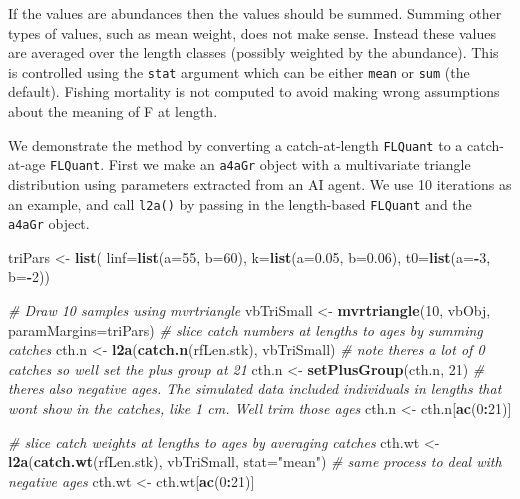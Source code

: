 \documentclass[
]{book}
\newenvironment{Shaded}{\begin{snugshade}}{\end{snugshade}}
\newcommand{\AttributeTok}[1]{\textcolor[rgb]{0.13,0.29,0.53}{#1}}
\newcommand{\CommentTok}[1]{\textcolor[rgb]{0.56,0.35,0.01}{\textit{#1}}}
\newcommand{\DecValTok}[1]{\textcolor[rgb]{0.00,0.00,0.81}{#1}}
\newcommand{\FloatTok}[1]{\textcolor[rgb]{0.00,0.00,0.81}{#1}}
\newcommand{\FunctionTok}[1]{\textcolor[rgb]{0.13,0.29,0.53}{\textbf{#1}}}
\newcommand{\NormalTok}[1]{#1}
\newcommand{\OtherTok}[1]{\textcolor[rgb]{0.56,0.35,0.01}{#1}}
\newcommand{\SpecialCharTok}[1]{\textcolor[rgb]{0.81,0.36,0.00}{\textbf{#1}}}
\newcommand{\StringTok}[1]{\textcolor[rgb]{0.31,0.60,0.02}{#1}}
\begin{document}
If the values are abundances then the values should be summed. Summing other types of values, such as mean weight, does not make sense. Instead these values are averaged over the length classes (possibly weighted by the abundance). This is controlled using the \texttt{stat} argument which can be either \texttt{mean} or \texttt{sum} (the default). Fishing mortality is not computed to avoid making wrong assumptions about the meaning of F at length.

We demonstrate the method by converting a catch-at-length \texttt{FLQuant} to a catch-at-age \texttt{FLQuant}. First we make an \texttt{a4aGr} object with a multivariate triangle distribution using parameters extracted from an AI agent. We use 10 iterations as an example, and call \texttt{l2a()} by passing in the length-based \texttt{FLQuant} and the \texttt{a4aGr} object.

\begin{Shaded}
\begin{Highlighting}[]
\NormalTok{triPars }\OtherTok{\textless{}{-}} \FunctionTok{list}\NormalTok{(}
  \AttributeTok{linf=}\FunctionTok{list}\NormalTok{(}\AttributeTok{a=}\DecValTok{55}\NormalTok{, }\AttributeTok{b=}\DecValTok{60}\NormalTok{),}
  \AttributeTok{k=}\FunctionTok{list}\NormalTok{(}\AttributeTok{a=}\FloatTok{0.05}\NormalTok{, }\AttributeTok{b=}\FloatTok{0.06}\NormalTok{),}
  \AttributeTok{t0=}\FunctionTok{list}\NormalTok{(}\AttributeTok{a=}\SpecialCharTok{{-}}\DecValTok{3}\NormalTok{, }\AttributeTok{b=}\SpecialCharTok{{-}}\DecValTok{2}\NormalTok{))}

\CommentTok{\# Draw 10 samples using mvrtriangle}
\NormalTok{vbTriSmall }\OtherTok{\textless{}{-}} \FunctionTok{mvrtriangle}\NormalTok{(}\DecValTok{10}\NormalTok{, vbObj, }\AttributeTok{paramMargins=}\NormalTok{triPars)}
\CommentTok{\# slice catch numbers at lengths to ages by summing catches}
\NormalTok{cth.n }\OtherTok{\textless{}{-}} \FunctionTok{l2a}\NormalTok{(}\FunctionTok{catch.n}\NormalTok{(rfLen.stk), vbTriSmall)}
\CommentTok{\# note there\textquotesingle{}s a lot of 0 catches so we\textquotesingle{}ll set the plus group at 21}
\NormalTok{cth.n }\OtherTok{\textless{}{-}} \FunctionTok{setPlusGroup}\NormalTok{(cth.n, }\DecValTok{21}\NormalTok{)}
\CommentTok{\# there\textquotesingle{}s also negative ages. The simulated data included individuals in lengths that won\textquotesingle{}t show in the catches, like 1 cm. We\textquotesingle{}ll trim those ages}
\NormalTok{cth.n }\OtherTok{\textless{}{-}}\NormalTok{ cth.n[}\FunctionTok{ac}\NormalTok{(}\DecValTok{0}\SpecialCharTok{:}\DecValTok{21}\NormalTok{)]}

\CommentTok{\# slice catch weights at lengths to ages by averaging catches}
\NormalTok{cth.wt }\OtherTok{\textless{}{-}} \FunctionTok{l2a}\NormalTok{(}\FunctionTok{catch.wt}\NormalTok{(rfLen.stk), vbTriSmall, }\AttributeTok{stat=}\StringTok{"mean"}\NormalTok{)}
\CommentTok{\# same process to deal with negative ages}
\NormalTok{cth.wt }\OtherTok{\textless{}{-}}\NormalTok{ cth.wt[}\FunctionTok{ac}\NormalTok{(}\DecValTok{0}\SpecialCharTok{:}\DecValTok{21}\NormalTok{)]}
\end{Highlighting}
\end{Shaded}
\end{document}
